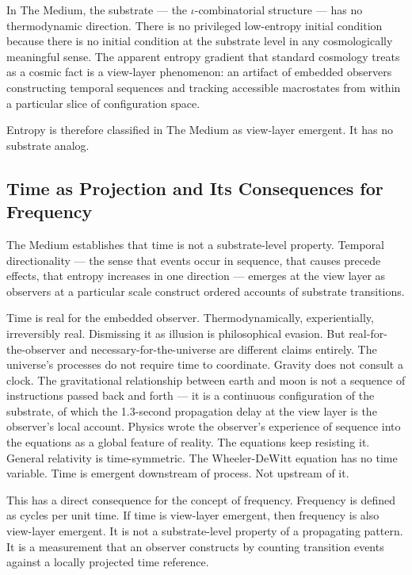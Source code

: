 \documentclass[11pt,letterpaper]{article}
\begin{document}
In The Medium, the substrate --- the \(\iota\)-combinatorial structure --- has no thermodynamic direction. There is no privileged low-entropy initial condition because there is no initial condition at the substrate level in any cosmologically meaningful sense. The apparent entropy gradient that standard cosmology treats as a cosmic fact is a view-layer phenomenon: an artifact of embedded observers constructing temporal sequences and tracking accessible macrostates from within a particular slice of configuration space.

Entropy is therefore classified in The Medium as view-layer emergent. It has no substrate analog.

\subsection{Time as Projection and Its Consequences for Frequency}
\label{sec:orgb573dd8}

The Medium establishes that time is not a substrate-level property. Temporal directionality --- the sense that events occur in sequence, that causes precede effects, that entropy increases in one direction --- emerges at the view layer as observers at a particular scale construct ordered accounts of substrate transitions.

Time is real for the embedded observer. Thermodynamically, experientially, irreversibly real. Dismissing it as illusion is philosophical evasion. But real-for-the-observer and necessary-for-the-universe are different claims entirely. The universe's processes do not require time to coordinate. Gravity does not consult a clock. The gravitational relationship between earth and moon is not a sequence of instructions passed back and forth --- it is a continuous configuration of the substrate, of which the 1.3-second propagation delay at the view layer is the observer's local account. Physics wrote the observer's experience of sequence into the equations as a global feature of reality. The equations keep resisting it. General relativity is time-symmetric. The Wheeler-DeWitt equation has no time variable. Time is emergent downstream of process. Not upstream of it.

This has a direct consequence for the concept of frequency. Frequency is defined as cycles per unit time. If time is view-layer emergent, then frequency is also view-layer emergent. It is not a substrate-level property of a propagating pattern. It is a measurement that an observer constructs by counting transition events against a locally projected time reference.
\end{document}
